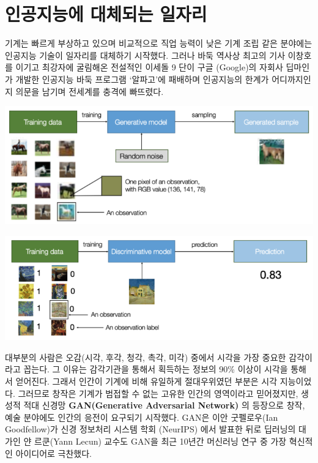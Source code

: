 \documentclass[smallextended]{svjour3}       %
\begin{document}
\hypertarget{challenge-to-human}{%
\section{인공지능에 대체되는 일자리}\label{challenge-to-human}}

기계\cite{brynjolfsson2014second, ford2015rise, kaplan2015humans, chang_2017}는
빠르게 부상하고 있으며 비교적으로 직업 능력이 낮은 기계 조립 같은
분야에는 인공지능 기술이 일자리를 대체하기 시작했다. 그러나 바둑 역사상
최고의 기사 이창호를 이기고 최강자에 굴림해온 전설적인 이세돌 9 단이
구글 (Google)의 자회사 딥마인가 개발한 인공지능 바둑 프로그램 `알파고'에
패배하며 인공지능의 한계가 어디까지인지 의문을 남기며 전세계를 충격에
빠뜨렸다.

\begin{center}\includegraphics[width=1\linewidth]{fig/generative-model} \end{center}

\begin{center}\includegraphics[width=1\linewidth]{fig/discriminative-model} \end{center}

대부분의 사람은 오감(시각, 후각, 청각, 촉각, 미각) 중에서 시각을 가장
중요한 감각이라고 꼽는다. 그 이유는 감각기관을 통해서 획득하는 정보의
90\% 이상이 시각을 통해서 얻어진다. 그래서 인간이 기계에 비해 유일하게
절대우위였던 부분은 시각 지능이었다. 그러므로 창작은 기계가 범접할 수
없는 고유한 인간의 영역이라고 믿어졌지만, 생성적 적대 신경망
\textbf{GAN(Generative Adversarial Network)}
\cite{brownlee_2019, hui_2018}의 등장으로 창작, 예술 분야에도 인간의
응전이 요구되기 시작했다. GAN은 이안 굿펠로우(Ian Goodfellow)가 신경
정보처리 시스템 학회 (NeurIPS) 에서 발표한 뒤로 딥러닝의 대가인 얀
르쿤(Yann Lecun) 교수도 GAN을 최근 10년간 머신러닝 연구 중 가장 혁신적인
아이디어로 극찬했다.
\end{document}
